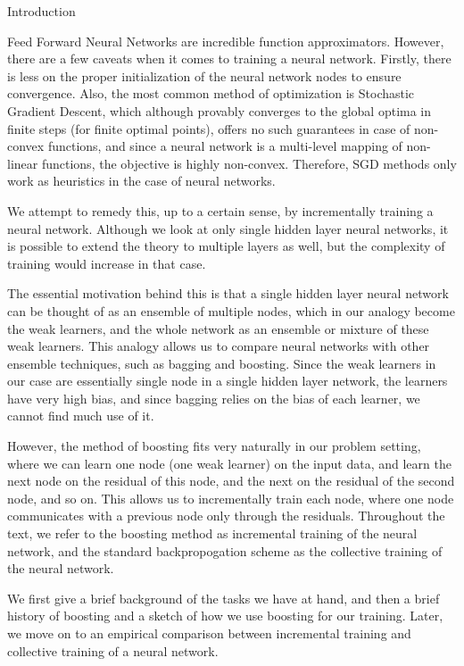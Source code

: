 \documentclass{article}
\begin{document}
\begin{psection}{Introduction}

	Feed Forward Neural Networks are incredible function approximators. However, there are a few caveats when it comes to training a neural network. Firstly, there is less on the proper initialization of the neural network nodes to ensure convergence. Also, the most common method of optimization is Stochastic Gradient Descent, which although provably converges to the global optima in finite steps (for finite optimal points), offers no such guarantees in case of non-convex functions, and since a neural network is a multi-level mapping of non-linear functions, the objective is highly non-convex. Therefore, SGD methods only work as heuristics in the case of neural networks.

	We attempt to remedy this, up to a certain sense, by incrementally training a neural network. Although we look at only single hidden layer neural networks, it is possible to extend the theory to multiple layers as well, but the complexity of training would increase in that case.

	The essential motivation behind this is that a single hidden layer neural network can be thought of as an ensemble of multiple nodes, which in our analogy become the weak learners, and the whole network as an ensemble or mixture of these weak learners. This analogy allows us to compare neural networks with other ensemble techniques, such as bagging and boosting. Since the weak learners in our case are essentially single node in a single hidden layer network, the learners have very high bias, and since bagging relies on the bias of each learner, we cannot find much use of it.

	However, the method of boosting fits very naturally in our problem setting, where we can learn one node (one weak learner) on the input data, and learn the next node on the residual of this node, and the next on the residual of the second node, and so on. This allows us to incrementally train each node, where one node communicates with a previous node only through the residuals. Throughout the text, we refer to the boosting method as incremental training of the neural network, and the standard backpropogation scheme as the collective training of the neural network.

	We first give a brief background of the tasks we have at hand, and then a brief history of boosting and a sketch of how we use boosting for our training. Later, we move on to an empirical comparison between incremental training and collective training of a neural network.

\end{psection}
\end{document}
